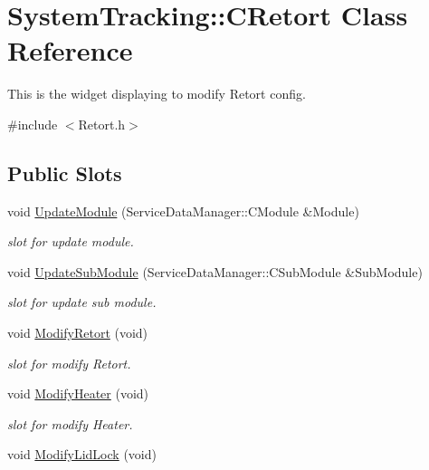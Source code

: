 \hypertarget{classSystemTracking_1_1CRetort}{\section{\-System\-Tracking\-:\-:\-C\-Retort \-Class \-Reference}
\label{classSystemTracking_1_1CRetort}
}


\-This is the widget displaying to modify \-Retort config.  




{\ttfamily \#include $<$\-Retort.\-h$>$}

\subsection*{\-Public \-Slots}
\begin{DoxyCompactItemize}
\item 
void \hyperlink{classSystemTracking_1_1CRetort_aa38abb7093aa43946cbeb65c7d3685d4}{\-Update\-Module} (\-Service\-Data\-Manager\-::\-C\-Module \&\-Module)
\begin{DoxyCompactList}\small\item\em slot for update module. \end{DoxyCompactList}\item 
void \hyperlink{classSystemTracking_1_1CRetort_a30be3ab9e7a5045e5ff7d97958cc1a6c}{\-Update\-Sub\-Module} (\-Service\-Data\-Manager\-::\-C\-Sub\-Module \&\-Sub\-Module)
\begin{DoxyCompactList}\small\item\em slot for update sub module. \end{DoxyCompactList}\item 
void \hyperlink{classSystemTracking_1_1CRetort_a0f66c9e9fd1d42a5ceb747545a137955}{\-Modify\-Retort} (void)
\begin{DoxyCompactList}\small\item\em slot for modify \-Retort. \end{DoxyCompactList}\item 
void \hyperlink{classSystemTracking_1_1CRetort_a3e6f11cd2a986d41cf538b31c75ebaf9}{\-Modify\-Heater} (void)
\begin{DoxyCompactList}\small\item\em slot for modify \-Heater. \end{DoxyCompactList}\item 
void \hyperlink{classSystemTracking_1_1CRetort_a2ac8cb6e6c3bb3eb81eeb4df1999a9b0}{\-Modify\-Lid\-Lock} (void)

\end{DoxyCompactItemize}
